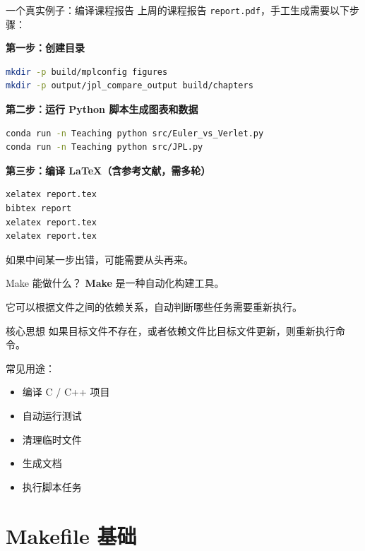 \documentclass[aspectratio=169]{ctexbeamer}
\begin{document}
\begin{frame}{一个真实例子：编译课程报告}
上周的课程报告 \texttt{report.pdf}，手工生成需要以下步骤：

\textbf{第一步：创建目录}

\begin{lstlisting}[language=bash]
mkdir -p build/mplconfig figures
mkdir -p output/jpl_compare_output build/chapters
\end{lstlisting}

\textbf{第二步：运行 Python 脚本生成图表和数据}

\begin{lstlisting}[language=bash]
conda run -n Teaching python src/Euler_vs_Verlet.py
conda run -n Teaching python src/JPL.py
\end{lstlisting}

\textbf{第三步：编译 LaTeX（含参考文献，需多轮）}

\begin{lstlisting}[language=bash]
xelatex report.tex
bibtex report
xelatex report.tex
xelatex report.tex
\end{lstlisting}

如果中间某一步出错，可能需要从头再来。
\end{frame}

\begin{frame}{Make 能做什么？}
\textbf{Make} 是一种自动化构建工具。

它可以根据文件之间的依赖关系，自动判断哪些任务需要重新执行。

\begin{block}{核心思想}
如果目标文件不存在，或者依赖文件比目标文件更新，则重新执行命令。
\end{block}

常见用途：

\begin{itemize}
  \item 编译 C / C++ 项目
  \item 自动运行测试
  \item 清理临时文件
  \item 生成文档
  \item 执行脚本任务
\end{itemize}
\end{frame}

\section{Makefile 基础}
\end{document}
